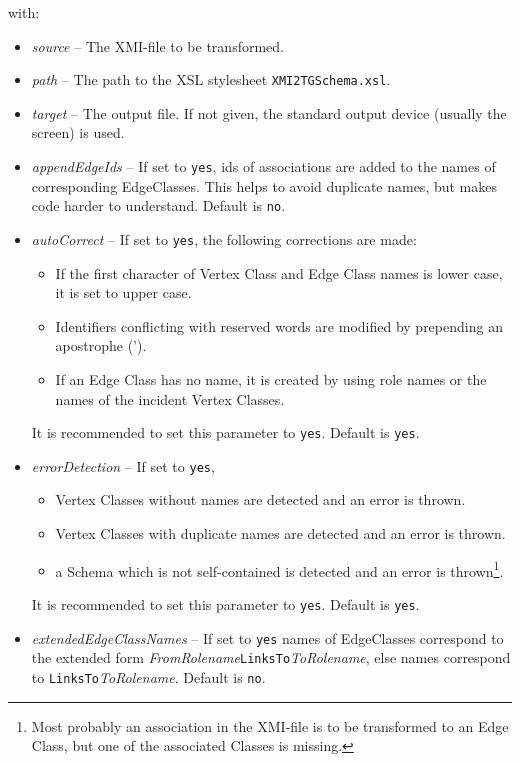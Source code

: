 \documentclass[a4paper]{article}
\begin{document}
	with:
	\begin{itemize}
		\item \emph{source} -- The XMI-file to be transformed.
		\item \emph{path} -- The path to the XSL stylesheet \texttt{XMI2TGSchema.xsl}.
		\item \emph{target} -- The output file. If not given, the standard output device (usually the screen) is used.
	\end{itemize}
	\begin{itemize}
		\item \emph{appendEdgeIds} -- If set to \texttt{yes}, ids of associations are added to the names of corresponding EdgeClasses. This helps to avoid duplicate names, but makes code harder to understand. Default is \texttt{no}.
		\item \emph{autoCorrect} -- If set to \texttt{yes}, the following corrections are made:
		\begin{itemize}
			\item If the first character of Vertex Class and Edge Class names is lower case, it is set to upper case.
			\item Identifiers conflicting with reserved words are modified by prepending an apostrophe (').
			\item If an Edge Class has no name, it is created by using role names or the names of the incident Vertex Classes. 
		\end{itemize}
		It is recommended to set this parameter to \texttt{yes}. Default is \texttt{yes}.
		\item \emph{errorDetection} -- If set to \texttt{yes},
		\begin{itemize}
			\item Vertex Classes without names are detected and an error is thrown.
			\item Vertex Classes with duplicate names are detected and an error is thrown.
			\item a Schema which is not self-contained is detected and an error is thrown\footnote{Most probably an association in the XMI-file is to be transformed to an Edge Class, but one of the associated Classes is missing.}.
		\end{itemize}
		It is recommended to set this parameter to \texttt{yes}. Default is \texttt{yes}.
		\item \emph{extendedEdgeClassNames} --  If set to \texttt{yes} names of EdgeClasses correspond to the extended form \emph{FromRolename}\texttt{LinksTo}\emph{ToRolename}, else names correspond to \texttt{LinksTo}\emph{ToRolename}. Default is \texttt{no}.

\end{itemize}
\end{document}
